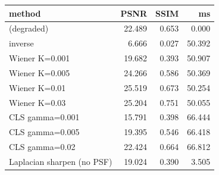 \begin{tabular}{lrrr}
\toprule
method & PSNR & SSIM & ms \\
\midrule
(degraded) & 22.489 & 0.653 & 0.000 \\
inverse & 6.666 & 0.027 & 50.392 \\
Wiener K=0.001 & 19.682 & 0.393 & 50.907 \\
Wiener K=0.005 & 24.266 & 0.586 & 50.369 \\
Wiener K=0.01 & 25.519 & 0.673 & 50.254 \\
Wiener K=0.03 & 25.204 & 0.751 & 50.055 \\
CLS gamma=0.001 & 15.791 & 0.398 & 66.444 \\
CLS gamma=0.005 & 19.395 & 0.546 & 66.418 \\
CLS gamma=0.02 & 22.424 & 0.664 & 66.812 \\
Laplacian sharpen (no PSF) & 19.024 & 0.390 & 3.505 \\
\bottomrule
\end{tabular}
